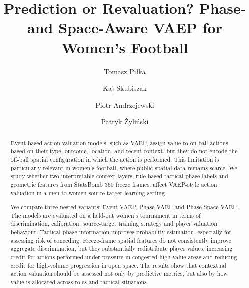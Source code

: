 \documentclass[runningheads]{llncs}
\newif\ifanonymous
\begin{document}
\title{Prediction or Revaluation? Phase- and Space-Aware VAEP for Women's Football}

\ifanonymous
  \author{Anonymous Author(s)}
  \authorrunning{Anonymous Author(s)}
  \institute{Paper under double-blind review}
\else
\author{
Tomasz Piłka \and
Kaj Skubiszak \and 
Piotr Andrzejewski \and 
Patryk Żyliński
}


\fi 

\maketitle
\begin{abstract}
Event-based action valuation models, such as VAEP, assign value to on-ball actions based on their type, outcome, location, and recent context, but they do not encode the off-ball spatial configuration in which the action is performed. This limitation is particularly relevant in women's football, where public spatial data remains scarce. We study whether two interpretable context layers, rule-based tactical phase labels and geometric features from StatsBomb 360 freeze frames, affect VAEP-style action valuation in a men-to-women source-target learning setting.

We compare three nested variants: Event-VAEP, Phase-VAEP and Phase-Space VAEP. The models are evaluated on a held-out women's tournament in terms of discrimination, calibration, source-target training strategy and player valuation behaviour. Tactical phase information improves probability estimation, especially for assessing risk of conceding. Freeze-frame spatial features do not consistently improve aggregate discrimination, but they substantially redistribute player values, increasing credit for actions performed under pressure in congested high-value areas and reducing credit for high-volume progression in open space. The results show that contextual action valuation should be assessed not only by predictive metrics, but also by how value is allocated across roles and tactical situations.

\end{abstract}
\end{document}
